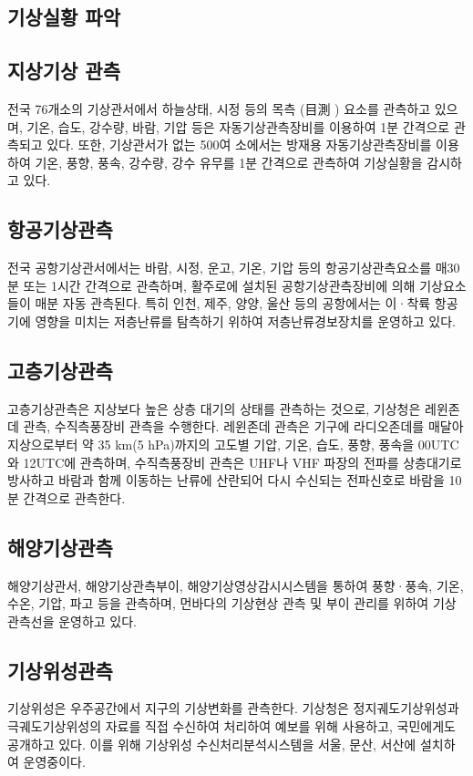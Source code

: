 \begin{corollary}

\section{기상실황 파악}

\subsection{지상기상 관측}
전국 76개소의 기상관서에서 하늘상태, 시정 등의 목측 (目測 ) 요소를 관측하고 있으며, 기온, 습도, 강수량, 바람, 기압 등은 자동기상관측장비를 이용하여 1분 간격으로 관측되고 있다. 또한, 기상관서가 없는 500여 소에서는 방재용 자동기상관측장비를 이용하여 기온, 풍향, 풍속, 강수량, 강수 유무를 1분 간격으로 관측하여 기상실황을 감시하고 있다.

\subsection{항공기상관측}
전국 공항기상관서에서는 바람, 시정, 운고, 기온, 기압 등의 항공기상관측요소를 매30분 또는 1시간 간격으로 관측하며, 활주로에 설치된 공항기상관측장비에 의해 기상요소들이 매분 자동 관측된다. 특히 인천, 제주, 양양, 울산 등의 공항에서는 이·착륙 항공기에 영향을 미치는 저층난류를 탐측하기 위하여 저층난류경보장치를 운영하고 있다.

\subsection{고층기상관측}
고층기상관측은 지상보다 높은 상층 대기의 상태를 관측하는 것으로, 기상청은 레윈존데 관측, 수직측풍장비 관측을 수행한다. 레윈존데 관측은 기구에 라디오존데를 매달아 지상으로부터 약 35 km(5 hPa)까지의 고도별 기압, 기온, 습도, 풍향, 풍속을 00UTC와 12UTC에 관측하며, 수직측풍장비 관측은 UHF나 VHF 파장의 전파를 상층대기로 방사하고 바람과 함께 이동하는 난류에 산란되어 다시 수신되는 전파신호로 바람을 10분 간격으로 관측한다.

\subsection{해양기상관측}
해양기상관서, 해양기상관측부이, 해양기상영상감시시스템을 통하여 풍향·풍속, 기온, 수온, 기압, 파고 등을 관측하며, 먼바다의 기상현상 관측 및 부이 관리를 위하여 기상관측선을 운영하고 있다.

\subsection{기상위성관측}
기상위성은 우주공간에서 지구의 기상변화를 관측한다. 기상청은 정지궤도기상위성과 극궤도기상위성의 자료를 직접 수신하여 처리하여 예보를 위해 사용하고, 국민에게도 공개하고 있다. 이를 위해 기상위성 수신처리분석시스템을 서울, 문산, 서산에 설치하여 운영중이다.


\end{corollary}
